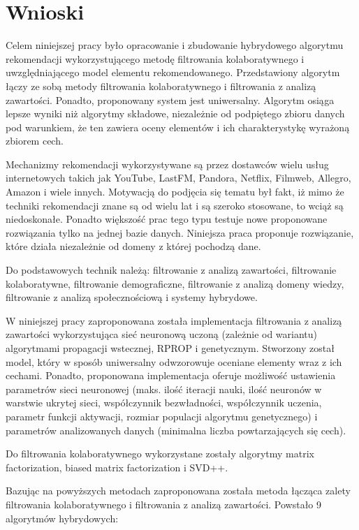 \documentclass[twoside]{iisthesis}
\begin{document}
\chapter{Wnioski}

	Celem niniejszej pracy było opracowanie i zbudowanie hybrydowego algorytmu rekomendacji wykorzystującego metodę filtrowania kolaboratywnego i uwzględniającego model elementu rekomendowanego. Przedstawiony algorytm łączy ze sobą metody filtrowania kolaboratywnego i filtrowania z analizą zawartości. Ponadto, proponowany system jest uniwersalny. Algorytm osiąga lepsze wyniki niż algorytmy składowe, niezależnie od podpiętego zbioru danych pod warunkiem, że ten zawiera oceny elementów i ich charakterystykę wyrażoną zbiorem cech.

	Mechanizmy rekomendacji wykorzystywane są przez dostawców wielu usług internetowych takich jak YouTube, LastFM, Pandora, Netflix, Filmweb, Allegro, Amazon i wiele innych. Motywacją do podjęcia się tematu był fakt, iż mimo że techniki rekomendacji znane są od wielu lat i są szeroko stosowane, to wciąż są niedoskonałe. Ponadto większość prac tego typu testuje nowe proponowane rozwiązania tylko na jednej bazie danych. Niniejsza praca proponuje rozwiązanie, które działa niezależnie od domeny z której pochodzą dane.
	
	Do podstawowych technik należą: filtrowanie z analizą zawartości, filtrowanie kolaboratywne, filtrowanie demograficzne, filtrowanie z analizą domeny wiedzy, filtrowanie z analizą społecznościową i systemy hybrydowe. 
	
	W niniejszej pracy zaproponowana została implementacja filtrowania z analizą zawartości wykorzystująca sieć neuronową uczoną (zależnie od wariantu) algorytmami propagacji wstecznej, RPROP i genetycznym. Stworzony został model, który w sposób uniwersalny odwzorowuje oceniane elementy wraz z ich cechami. Ponadto, proponowana implementacja oferuje możliwość ustawienia parametrów sieci neuronowej (maks. ilość iteracji nauki, ilość neuronów w warstwie ukrytej sieci, współczynnik bezwładności, współczynnik uczenia, parametr funkcji aktywacji, rozmiar populacji algorytmu genetycznego) i parametrów analizowanych danych (minimalna liczba powtarzających się cech).
	
	Do filtrowania kolaboratywnego wykorzystane zostały algorytmy matrix factorization, biased matrix factorization i SVD++.
	
	Bazując na powyższych metodach zaproponowana została metoda łącząca zalety filtrowania kolaboratywnego i filtrowania z analizą zawartości. Powstało 9 algorytmów hybrydowych: 
	
\end{document}
